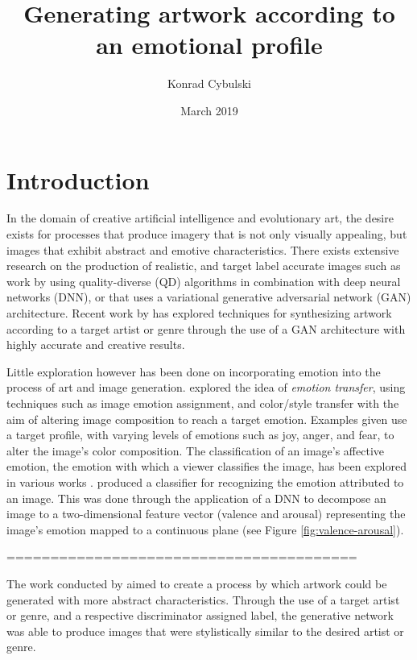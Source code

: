 \documentclass{article}
\title{Generating artwork according to an emotional profile}
\author{Konrad Cybulski}
\date{March 2019}
\begin{document}
	
	\maketitle
	
	\section{Introduction}
	
	In the domain of creative artificial intelligence and evolutionary art, the desire exists for processes that produce imagery that is not only visually appealing, but images that exhibit abstract and emotive characteristics.
	There exists extensive research on the production of realistic, and target label accurate images such as work by \citet{nguyen2015innovation} using quality-diverse (QD) algorithms in combination with deep neural networks (DNN), or \citet{bao2017cvae} that uses a variational generative adversarial network (GAN) architecture.
	Recent work by \citet{tan2017artgan} has explored techniques for synthesizing artwork according to a target artist or genre through the use of a GAN architecture with highly accurate and creative results.
	
	Little exploration however has been done on incorporating emotion into the process of art and image generation.
	\citet{ali2017emotional} explored the idea of \textit{emotion transfer}, using techniques such as image emotion assignment, and color/style transfer with the aim of altering image composition to reach a target emotion.
	Examples given use a target profile, with varying levels of emotions such as joy, anger, and fear, to alter the image's color composition.
	The classification of an image's affective emotion, the emotion with which a viewer classifies the image, has been explored in various works \citep{machajdik2010affective, chen2015learning, kim2018building}.
	\citet{kim2018building} produced a classifier for recognizing the emotion attributed to an image.
	This was done through the application of a DNN to decompose an image to a two-dimensional feature vector (valence and arousal) representing the image's emotion mapped to a continuous plane (see Figure \ref{fig:valence-arousal}).
	
	========================================
	
	The work conducted by \citet{tan2017artgan} aimed to create a process by which artwork could be generated with more abstract characteristics. 
	Through the use of a target artist or genre, and a respective discriminator assigned label, the generative network was able to produce images that were stylistically similar to the desired artist or genre.
	
\end{document}
